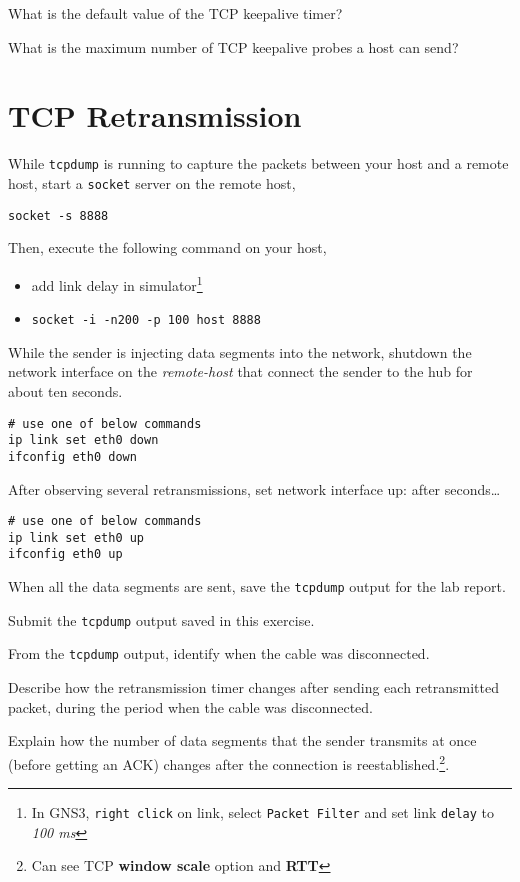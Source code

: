 \documentclass{../UTNetLab}
\begin{document}
    \begin{report}
    \item What is the default value of the TCP keepalive timer?
    
    \item What is the maximum number of TCP keepalive probes a host can send?
    \end{report}

\section{TCP Retransmission}
    While \lstinline{tcpdump} is running to capture the packets between your host and a remote host, start a \lstinline{socket} server on the remote host,
    \begin{lstlisting}
socket -s 8888
    \end{lstlisting}
    Then, execute the following command on your host,
    \begin{itemize}
        \item add link delay in simulator\footnote{In GNS3, \lstinline{right click} on link, select \lstinline{Packet Filter} and set link \lstinline{delay} to \textit{100 ms}}
        \item \lstinline[emph={host}]{socket -i -n200 -p 100 host 8888}
    \end{itemize}
    While the sender is injecting data segments into the network, shutdown the network interface on the \textit{remote-host} that connect the sender to the hub for about ten seconds.
    \begin{lstlisting}[emph={eth0}]
# use one of below commands
ip link set eth0 down
ifconfig eth0 down
    \end{lstlisting}

    After observing several retransmissions, set network interface up:
after seconds\ldots
    \begin{lstlisting}[emph={eth0}]
# use one of below commands
ip link set eth0 up
ifconfig eth0 up
    \end{lstlisting} %
    When all the data segments are sent, save the \lstinline{tcpdump} output for the lab report.
    
    \begin{report}
    \item Submit the \lstinline{tcpdump} output saved in this exercise.
    
    \item From the \lstinline{tcpdump} output, identify when the cable was disconnected.
    
    \item Describe how the retransmission timer changes after sending each retransmitted packet, during the period when the cable was disconnected.
    
    \item Explain how the number of data segments that the sender transmits at once (before getting an ACK) changes after the connection is reestablished.\footnote{Can see TCP \textbf{window scale} option and \textbf{RTT}}.
    \end{report}
    
\end{document}
